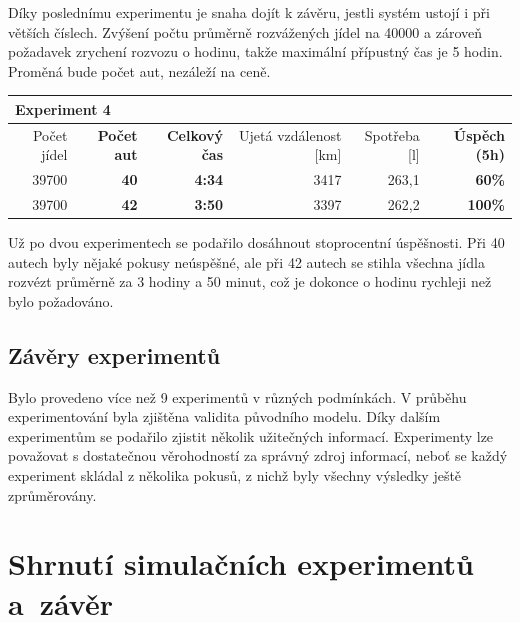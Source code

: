 \documentclass[a4paper, 11pt]{article}
\begin{document}
	Díky poslednímu experimentu je snaha dojít k závěru, jestli systém ustojí
	i při větších číslech. Zvýšení počtu průměrně rozvážených jídel na 40000 a
	zároveň požadavek zrychení rozvozu o hodinu, takže maximální přípustný čas
	je 5 hodin. Proměná bude počet aut, nezáleží na ceně.

	\begin{table}[h!]
		\centering
		\begin{tabular}{|r|r|r|r|r|r|}
			\hline
			\multicolumn{6}{|l|}{\textbf{Experiment 4}}   \\ \hline
			 Počet jídel & \textbf{Počet aut} & \textbf{Celkový čas} & Ujetá vzdálenost [km] & Spotřeba [l] & \textbf{Úspěch (5h)} \\ \hline
			 39700 & \textbf{40} & \textbf{4:34} & 3417 & 263,1 & \textbf{60\%}  \\ \hline
			 39700 & \textbf{42} & \textbf{3:50} & 3397 & 262,2 & \textbf{100\%} \\ \hline
		\end{tabular}
	\end{table}

	Už po dvou experimentech se podařilo dosáhnout stoprocentní úspěšnosti. Při
	40 autech byly nějaké pokusy neúspěšné, ale při 42 autech se stihla všechna
	jídla rozvézt průměrně za 3 hodiny a 50 minut, což je dokonce o hodinu rychleji
	než bylo požadováno.


	\subsection{Závěry experimentů}

	Bylo provedeno více než 9 experimentů v různých podmínkách. V průběhu experimentování
	byla zjištěna validita původního modelu. Díky dalším experimentům se podařilo zjistit
	několik užitečných informací. Experimenty lze považovat s dostatečnou věrohodností za
	správný zdroj informací, neboť se každý experiment skládal z několika pokusů, z nichž
	byly všechny výsledky ještě zprůměrovány.



	\section{Shrnutí simulačních experimentů a~závěr}



	\clearpage
	
	\renewcommand{\refname}{Literatura}
	
\end{document}

